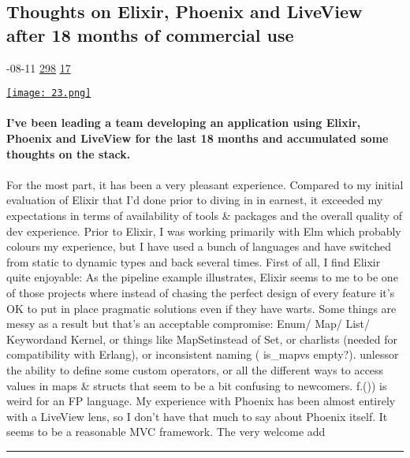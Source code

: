 \documentclass[10pt,a4paper]{article}
\begin{document}
\begin{multicols*}{2}
\begin{minipage}{\linewidth}
\subsection{Thoughts on Elixir, Phoenix and LiveView after 18 months of commercial use}
\textsc{\footnotesize
{\scriptsize\faCalendar}-08-11 
{\scriptsize\faThumbsOUp}\space 
\href{http://news.ycombinator.com/item?id=37114457\&utm\_term=comment}{298} 
{\scriptsize\faComments}\space 
\href{http://news.ycombinator.com/item?id=37114457\&utm\_term=comment}{17} 
}
\par\medskip\noindent
\href{https://korban.net/posts/2023-08-11-thoughts-on-elixir-phoenix-liveview/?utm\_source=hackernewsletter\&utm\_medium=email\&utm\_term=code}{
    \texttt{[image: 23.png]}
}
\end{minipage}
\paragraph{}
\textbf{I’ve been leading a team developing an application using Elixir, Phoenix and LiveView for the last 18 months and accumulated some thoughts on the stack.}
\paragraph{}
 For the most part, it has been a very pleasant experience.
Compared to my initial evaluation of Elixir that I’d done prior to diving in in earnest, it exceeded my expectations in terms of availability of tools \& packages and the overall quality of dev experience.
Prior to Elixir, I was working primarily with Elm which probably colours my experience, but I have used a bunch of languages and have switched from static to dynamic types and back several times.
First of all, I find Elixir quite enjoyable:
As the pipeline example illustrates, Elixir seems to me to be one of those projects where instead of chasing the perfect design of every feature it’s OK to put in place pragmatic solutions even if they have warts. Some things are messy as a result but that’s an acceptable compromise:
Enum/
Map/
List/
Keywordand
Kernel, or things like
MapSetinstead of
Set, or charlists (needed for compatibility with Erlang), or inconsistent naming (
is\_mapvs
empty?).
unlessor the ability to define some custom operators, or all the different ways to access values in maps \& structs that seem to be a bit confusing to newcomers.
f.()) is weird for an FP language.
My experience with Phoenix has been almost entirely with a LiveView lens, so I don’t have that much to say about Phoenix itself. It seems to be a reasonable MVC framework. The very welcome add
\par\noindent\textcolor{red}{\rule{\linewidth}{0.2mm}}
\vfill
\null
\noindent\begin{minipage}{\linewidth}

\end{minipage}
\end{multicols*}
\end{document}
